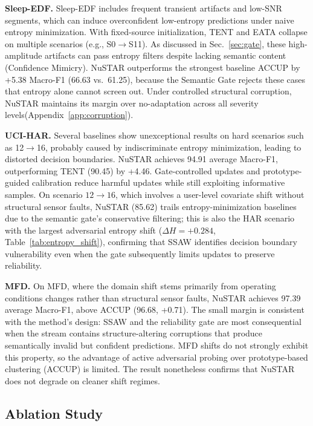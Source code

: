 \documentclass[sigconf, screen, review, anonymous]{acmart}
\theoremstyle{plain}
\theoremstyle{definition}
\theoremstyle{remark}
\begin{document}
	\textbf{Sleep-EDF.}
	Sleep-EDF includes frequent transient artifacts and low-SNR segments, which can induce overconfident low-entropy predictions under naive entropy minimization. With fixed-source initialization, TENT and EATA collapse on multiple scenarios (e.g., S0$\to$S11). As discussed in Sec.~\ref{sec:gate}, these high-amplitude artifacts can pass entropy filters despite lacking semantic content (Confidence Mimicry). NuSTAR outperforms the strongest baseline ACCUP by +5.38 Macro-F1 (66.63 vs.\ 61.25), because the Semantic Gate rejects these cases that entropy alone cannot screen out. Under controlled structural corruption, NuSTAR maintains its margin over no-adaptation across all severity levels(Appendix~\ref{app:corruption}).

	\textbf{UCI-HAR.}
	Several baselines show unexceptional results on hard scenarios such as 12$\to$16, probably caused by indiscriminate entropy minimization, leading to distorted decision boundaries. NuSTAR achieves 94.91 average Macro-F1, outperforming TENT (90.45) by +4.46. Gate-controlled updates and prototype-guided calibration reduce harmful updates while still exploiting informative samples. 
	On scenario $12{\to}16$, which involves a user-level covariate shift without structural sensor faults, NuSTAR (85.62) trails entropy-minimization baselines due to the semantic gate's conservative filtering; this is also the HAR scenario with the largest adversarial entropy shift ($\Delta H = +0.284$, Table~\ref{tab:entropy_shift}), confirming that SSAW identifies decision boundary vulnerability even when the gate subsequently limits updates to preserve reliability.

	\textbf{MFD.}
	On MFD, where the domain shift stems primarily from operating conditions
	changes rather than structural sensor faults, NuSTAR achieves 97.39 average Macro-F1, above ACCUP (96.68, +0.71). 
	The small margin is consistent with the method's design: SSAW and the reliability gate are most consequential when the stream contains structure-altering corruptions
	that produce semantically invalid but confident predictions. MFD shifts do not strongly exhibit this property, so the advantage of active adversarial probing over prototype-based clustering (ACCUP) is limited. The result nonetheless confirms that NuSTAR does not degrade on cleaner shift regimes.

	\subsection{Ablation Study}
	\label{sec:ablation}
\end{document}
